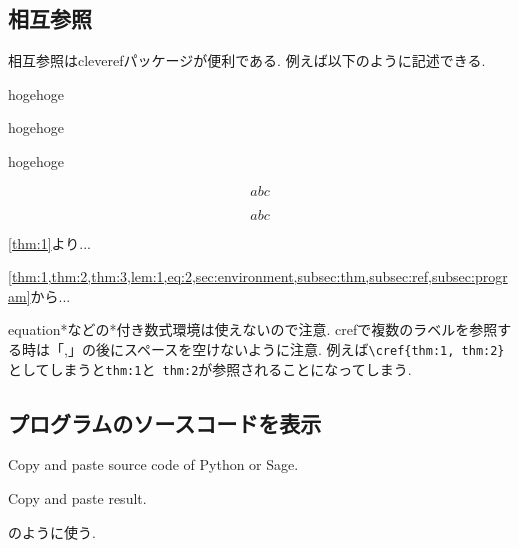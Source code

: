 \documentclass[11pt,a4paper,oneside,lualatex]{ltjsarticle} %
\numberwithin{equation}{section} %
\begin{document}

\subsection{相互参照} \label{subsec:ref}


相互参照はcleverefパッケージが便利である. 
例えば以下のように記述できる.

\begin{thm} \label{thm:2}
	hogehoge
\end{thm}

\begin{thm} \label{thm:3}
	hogehoge
\end{thm}

\begin{lem} \label{lem:1}
	hogehoge
\end{lem}

\begin{equation} \label{eq:1}
	abc
\end{equation}

\begin{equation} \label{eq:2}
	abc
\end{equation}

\cref{thm:1}より... 

\cref{thm:1,thm:2,thm:3,lem:1,eq:2,sec:environment,subsec:thm,subsec:ref,subsec:program}から...

equation*などの*付き数式環境は使えないので注意.
crefで複数のラベルを参照する時は「,」の後にスペースを空けないように注意.
例えば\verb*|\cref{thm:1, thm:2}|としてしまうと\verb|thm:1|と\verb*| thm:2|が参照されることになってしまう. 


\subsection{プログラムのソースコードを表示} \label{subsec:program}


\begin{Python}
Copy and paste source code of Python or Sage.
\end{Python}
\begin{result}
Copy and paste result.
\end{result}
のように使う.
\end{document}
